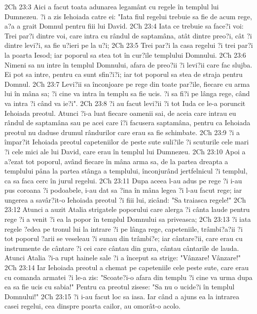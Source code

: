 2Ch 23:3  Aici a facut toata adunarea legamânt cu regele în templul lui Dumnezeu. ?i a zis Iehoiada catre ei: "Iata fiul regelui trebuie sa fie de acum rege, a?a a grait Domnul pentru fiii lui David.
2Ch 23:4  Iata ce trebuie sa face?i voi: Trei par?i dintre voi, care intra cu rândul de saptamâna, atât dintre preo?i, cât ?i dintre levi?i, sa fie u?ieri pe la u?i;
2Ch 23:5  Trei par?i la casa regelui ?i trei par?i la poarta Iesod; iar poporul sa stea tot în cur?ile templului Domnului.
2Ch 23:6  Nimeni sa nu intre în templul Domnului, afara de preo?ii ?i levi?ii care fac slujba. Ei pot sa intre, pentru ca sunt sfin?i?i; iar tot poporul sa stea de straja pentru Domnul.
2Ch 23:7  Levi?ii sa înconjoare pe rege din toate par?ile, fiecare cu arma lui în mâna sa; ?i cine va intra în templu sa fie ucis. ?i sa fi?i pe lânga rege, când va intra ?i când va ie?i".
2Ch 23:8  ?i au facut levi?ii ?i tot Iuda ce le-a poruncit Iehoiada preotul. Atunci ?i-a luat fiecare oamenii sai, de aceia care intrau eu rândul de saptamâna sau pe acei care î?i facusera saptamâna, pentru ca Iehoiada preotul nu daduse drumul rândurilor care erau sa fie schimbate.
2Ch 23:9  ?i a împar?it Iehoiada preotul capeteniilor de peste sute suli?ile ?i scuturile cele mari ?i cele mici ale lui David, care erau în templul lui Dumnezeu.
2Ch 23:10  Apoi a a?ezat tot poporul, având fiecare în mâna arma sa, de la partea dreapta a templului pâna la partea stânga a templului, înconjurând jertfelnicul ?i templul, ca sa faca cerc în jurul regelui.
2Ch 23:11  Dupa aceea l-au adus pe rege ?i i-au pus coroana ?i podoabele, i-au dat sa ?ina în mâna legea ?i l-au facut rege; iar ungerea a savâr?it-o Iehoiada preotul ?i fiii lui, zicând: "Sa traiasca regele!"
2Ch 23:12  Atunci a auzit Atalia strigatele poporului care alerga ?i cânta laude pentru rege ?i a venit ?i ea la popor în templul Domnului sa priveasca;
2Ch 23:13  ?i iata regele ?edea pe tronul lui la intrare ?i pe lânga rege, capeteniile, trâmbi?a?ii ?i tot poporul ?arii se veseleau ?i sunau din trâmbi?e; iar cântare?ii, care erau cu instrumente de cântare ?i cei care cântau din gura, cântau cântarile de lauda. Atunci Atalia ?i-a rupt hainele sale ?i a început sa strige: "Vânzare! Vânzare!"
2Ch 23:14  Iar Iehoiada preotul a chemat pe capeteniile cele peste sute, care erau cu comanda armatei ?i le-a zis: "Scoate?i-o afara din templu ?i cine va urma dupa ea sa fie ucis cu sabia!" Pentru ca preotul zisese: "Sa nu o ucide?i în templul Domnului!"
2Ch 23:15  ?i i-au facut loc sa iasa. Iar când a ajuns ea la intrarea casei regelui, cea dinspre poarta cailor, au omorât-o acolo.
